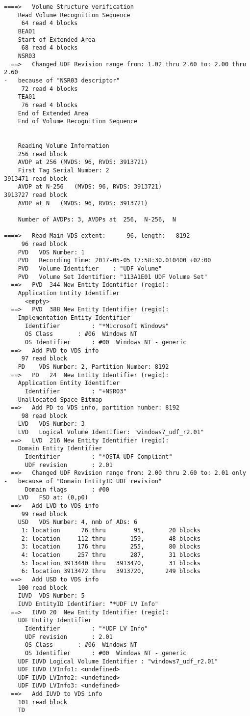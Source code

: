 \begin{lstlisting}
====>   Volume Structure verification
    Read Volume Recognition Sequence
     64 read 4 blocks
    BEA01
    Start of Extended Area
     68 read 4 blocks
    NSR03
  ==>   Changed UDF Revision range from: 1.02 thru 2.60 to: 2.00 thru 2.60
-   because of "NSR03 descriptor"
     72 read 4 blocks
    TEA01
     76 read 4 blocks
    End of Extended Area
    End of Volume Recognition Sequence


    Reading Volume Information
    256 read block
    AVDP at 256 (MVDS: 96, RVDS: 3913721)
    First Tag Serial Number: 2
3913471 read block
    AVDP at N-256   (MVDS: 96, RVDS: 3913721)
3913727 read block
    AVDP at N   (MVDS: 96, RVDS: 3913721)

    Number of AVDPs: 3, AVDPs at  256,  N-256,  N

====>   Read Main VDS extent:      96, length:   8192
     96 read block
    PVD   VDS Number: 1
    PVD   Recording Time: 2017-05-05 17:58:30.010400 +02:00
    PVD   Volume Identifier    : "UDF Volume"
    PVD   Volume Set Identifier: "113A1E01 UDF Volume Set"
  ==>   PVD  344 New Entity Identifier (regid):
    Application Entity Identifier
      <empty>
  ==>   PVD  388 New Entity Identifier (regid):
    Implementation Entity Identifier
      Identifier         : "*Microsoft Windows"
      OS Class       : #06  Windows NT
      OS Identifier      : #00  Windows NT - generic
  ==>   Add PVD to VDS info
     97 read block
    PD    VDS Number: 2, Partition Number: 8192
  ==>   PD   24  New Entity Identifier (regid):
    Application Entity Identifier
      Identifier         : "+NSR03"
    Unallocated Space Bitmap
  ==>   Add PD to VDS info, partition number: 8192
     98 read block
    LVD   VDS Number: 3
    LVD   Logical Volume Identifier: "windows7_udf_r2.01"
  ==>   LVD  216 New Entity Identifier (regid):
    Domain Entity Identifier
      Identifier         : "*OSTA UDF Compliant"
      UDF revision       : 2.01
  ==>   Changed UDF Revision range from: 2.00 thru 2.60 to: 2.01 only
-   because of "Domain EntityID UDF revision"
      Domain flags       : #00
    LVD   FSD at: (0,p0)
  ==>   Add LVD to VDS info
     99 read block
    USD   VDS Number: 4, nmb of ADs: 6
     1: location      76 thru        95,       20 blocks
     2: location     112 thru       159,       48 blocks
     3: location     176 thru       255,       80 blocks
     4: location     257 thru       287,       31 blocks
     5: location 3913440 thru   3913470,       31 blocks
     6: location 3913472 thru   3913720,      249 blocks
  ==>   Add USD to VDS info
    100 read block
    IUVD  VDS Number: 5
    IUVD EntityID Identifier: "*UDF LV Info"
  ==>   IUVD 20  New Entity Identifier (regid):
    UDF Entity Identifier
      Identifier         : "*UDF LV Info"
      UDF revision       : 2.01
      OS Class       : #06  Windows NT
      OS Identifier      : #00  Windows NT - generic
    UDF IUVD Logical Volume Identifier : "windows7_udf_r2.01"
    UDF IUVD LVInfo1: <undefined>
    UDF IUVD LVInfo2: <undefined>
    UDF IUVD LVInfo3: <undefined>
  ==>   Add IUVD to VDS info
    101 read block
    TD  


\end{lstlisting}
